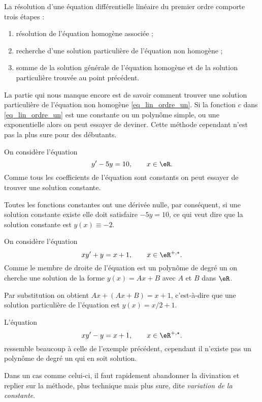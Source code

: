 \begin{Aretenir}
	La résolution d'une équation différentielle linéaire du premier ordre comporte trois étapes :
	\begin{enumerate}
		\item résolution de l'équation homogène associée ;
		\item recherche d'une solution particulière de l'équation non homogène ;
		\item somme de la solution générale de l'équation homogène et de la solution particulière trouvée au point précédent.
	\end{enumerate}
\end{Aretenir}
La partie qui nous manque encore est de savoir comment trouver une solution particulière de l'équation non homogène \eqref{eq_lin_ordre_un}. Si la fonction $c$ dans \eqref{eq_lin_ordre_un} est une constante ou un polynôme simple, ou une exponentielle alors on peut essayer de deviner. Cette méthode cependant n'est pas la plus sure pour des débutants.

\begin{example}
	On considère l'équation
	\begin{equation}
		y'-5y = 10, \qquad x\in\eR.
	\end{equation}
	Comme tous les coefficients de l'équation sont constants on peut essayer de trouver une solution constante.

	Toutes les fonctions constantes ont une dérivée nulle, par conséquent, si une solution constante existe elle doit satisfaire $-5y = 10$, ce qui veut dire que la solution constante est $y(x)\equiv -2$.
\end{example}

\begin{example}
	On considère l'équation
	\begin{equation}
		xy'+y = x+1, \qquad x\in\eR^{+,\star}.
	\end{equation}
	Comme le membre de droite de l'équation est un polynôme de degré un on cherche une solution de la forme $y(x) = Ax + B$ avec $A$ et $B$ dans $\eR$.

	Par substitution on obtient $Ax + (Ax +B) = x+1$, c'est-à-dire que une solution particulière de l'équation est $y(x) = x/2+1$.
\end{example}

\begin{example}
	L'équation
	\begin{equation}
		xy'-y = x+1, \qquad x\in\eR^{+,\star}.
	\end{equation}
	ressemble beaucoup à celle de l'exemple précédent, cependant il n'existe pas un polynôme de degré un qui en soit solution.

	Dans un cas comme celui-ci, il faut rapidement abandonner la divination et replier sur la méthode, plus technique mais plus sure, dite  \emph{variation de la constante}.
\end{example}


